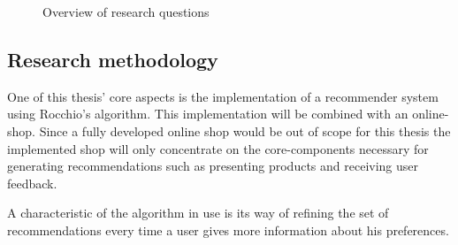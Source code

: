 \begin{figure}[h!]

    \caption{Overview of research questions}
    \label{fig:research-questions}

\end{figure}







\subsection{Research methodology}
One of this thesis' core aspects is the implementation of a recommender system using Rocchio's algorithm.
This implementation will be combined with an online-shop.
Since a fully developed online shop would be out of scope for this thesis the implemented shop will only concentrate on the core-components necessary for generating recommendations such as presenting products and receiving user feedback.

A characteristic of the algorithm in use is its way of refining the set of recommendations every time a user gives more information about his preferences.\citep[p. 92]{lops:2011}

